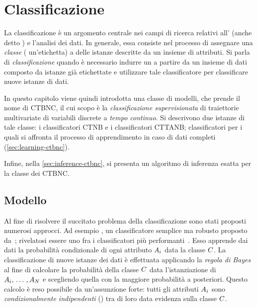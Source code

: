 
\chapter{Classificazione}
\label{cap:ctbnc}
La classificazione è un argomento centrale nei campi di ricerca relativi all' (anche detto ) e l'analisi dei dati. In generale, essa consiste nel processo di assegnare una \emph{classe} (\ie{} un'etichetta) a delle istanze descritte da un insieme di attributi. Si parla di \emph{classificazione } quando è necessario indurre un  a partire da un insieme di dati composto da istanze già etichettate e utilizzare tale classificatore per classificare nuove istanze di dati.

In questo capitolo viene quindi introdotta una classe di modelli, che prende il nome di \acf{CTBNC}, il cui scopo è la \emph{classificazione supervisionata} di traiettorie multivariate di variabili discrete a \emph{tempo continuo}. Si descrivono due istanze di tale classe: i classificatori \acf{CTNB} e i classificatori \acf{CTTANB}; classificatori per i quali si affronta il processo di apprendimento in caso di dati completi (\autoref{sec:learning-ctbnc}).

Infine, nella \autoref{sec:inference-ctbnc}, si presenta un algoritmo di inferenza esatta per la classe dei \acs{CTBNC}.


\section{Modello}\label{sec:ctbnc-model}
Al fine di risolvere il succitato problema della classificazione sono stati proposti numerosi approcci. Ad esempio \lwcase \nb{} \class{}, un classificatore semplice ma robusto proposto da~\citet{DudaHart1973}; rivelatosi essere uno fra i classificatori più performanti~\citep{Langley1992}. Esso apprende dai dati la probabilità condizionale di ogni attributo $\mathnormal{A}_i$ data la classe $\mathnormal{C}$. La classificazione di nuove istanze dei dati è effettuata applicando la \emph{regola di Bayes} al fine di calcolare la probabilità della classe $\mathnormal{C}$ data l'istanziazione di $\mathnormal{A}_i,\,\dotsc\,,\mathnormal{A}_N$ e scegliendo quella con la maggiore probabilità a posteriori. Questo calcolo è reso possibile da un'assunzione forte: tutti gli attributi $\mathnormal{A}_i$ sono \emph{condizionalmente indipendenti} () tra di loro data evidenza sulla classe $\mathnormal{C}$.

